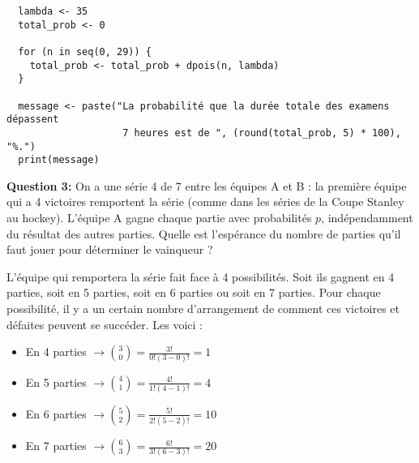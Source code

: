 \documentclass[10pt,a4paper]{article}
\begin{document}
	\begin{verbatim}
  lambda <- 35
  total_prob <- 0
		
  for (n in seq(0, 29)) {
    total_prob <- total_prob + dpois(n, lambda)
  }

  message <- paste("La probabilité que la durée totale des examens dépassent 
                    7 heures est de ", (round(total_prob, 5) * 100), "%.")
  print(message)
	\end{verbatim}
			

	\vspace{.3cm}
	\textbf{{Question 3:}} On a une série 4 de 7 entre les équipes A et B : la première équipe qui a 4 victoires remportent la série (comme dans les séries de la Coupe Stanley au hockey). L'équipe A gagne chaque partie avec probabilités $p$, indépendamment du résultat des autres parties. Quelle est l'espérance du nombre de parties qu'il faut jouer pour déterminer le vainqueur ?
	
	\vspace{.3cm}
	L'équipe qui remportera la série fait face à 4 possibilités. Soit ils gagnent en 4 parties, soit en 5 parties, soit en 6 parties ou soit en 7 parties. Pour chaque possibilité, il y a un certain nombre d'arrangement de comment ces victoires et défaites peuvent se succéder. Les voici :

	\begin{itemize}
		\item En 4 parties $\rightarrow \binom{3}{0} = \frac{3!}{0!(3 - 0)!} = 1$
	
		\vspace{-.1cm}
		\item En 5 parties $\rightarrow \binom{4}{1} = \frac{4!}{1!(4 - 1)!} = 4$
		
		\vspace{-.1cm}
		\item En 6 parties $\rightarrow \binom{5}{2} = \frac{5!}{2!(5 - 2)!} = 10$
		
		\vspace{-.1cm}
		\item En 7 parties $\rightarrow \binom{6}{3} = \frac{6!}{3!(6 - 3)!} = 20$
	\end{itemize}
 
\end{document}
